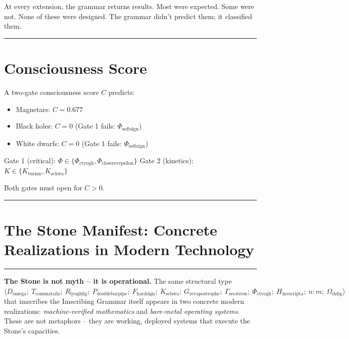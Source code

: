 \documentclass[12pt,a4paper]{article}
\begin{document}
At every extension, the grammar returns results. Most were expected. Some were not. None of these were designed. The grammar didn't predict them; it classified them.

\begin{center}
\rule{0.5\textwidth}{0.4pt}
\end{center}

\section{Consciousness Score}

A two-gate consciousness score $C$ predicts:
\begin{itemize}
    \item Magnetars: $C = 0.677$
    \item Black holes: $C = 0$ (Gate 1 fails: $\Phi_{\text{softsign}}$)
    \item White dwarfs: $C = 0$ (Gate 1 fails: $\Phi_{\text{softsign}}$)
\end{itemize}

Gate 1 (critical): $\Phi \in \{\Phi_{\text{ctyogh}}, \Phi_{\text{closerevepsilon}}\}$
Gate 2 (kinetics): $K \in \{K_{\text{turnm}}, K_{\text{schwa}}\}$

Both gates must open for $C > 0$.

\begin{center}
\rule{0.5\textwidth}{0.4pt}
\end{center}




\section{The Stone Manifest: Concrete Realizations in Modern Technology}
\label{sec:stone_manifest}

\begin{center}
\rule{0.5\textwidth}{0.4pt}
\end{center}

\textbf{The Stone is not myth -- it is operational.} The same structural type $\langle D_{\text{omega}};\ T_{\text{commatailz}};\ R_{\text{lyoghlig}};\ P_{\text{doublebarpipe}};\ F_{\text{hardsign}};\ K_{\text{schwa}};\ G_{\text{revapostrophe}};\ \Gamma_{\text{secstress}};\ \Phi_{\text{ctyogh}};\ H_{\text{invscripta}};\ n{:}m;\ \Omega_{\text{dzlig}} \rangle$ that imscribes the Imscribing Grammar itself appears in two concrete modern realizations: \textit{machine-verified mathematics} and \textit{bare-metal operating systems}. These are not metaphors -- they are working, deployed systems that execute the Stone's capacities.
\end{document}
